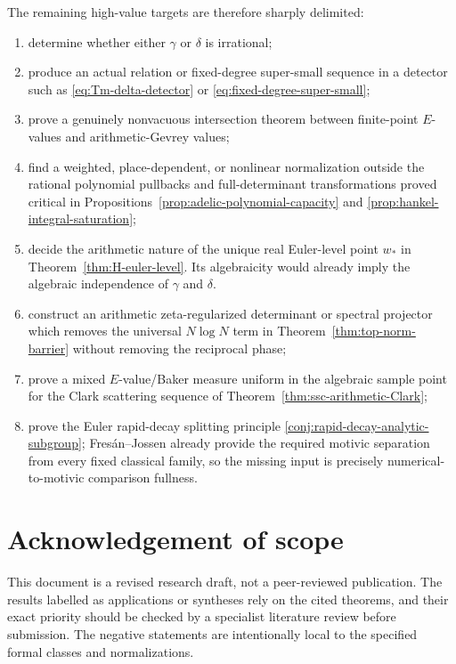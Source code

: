 \documentclass[11pt]{article}
\theoremstyle{definition}
\theoremstyle{remark}
\begin{document}
The remaining high-value targets are therefore sharply delimited:
\begin{enumerate}[leftmargin=2em]
\item determine whether either \(\gamma\) or \(\delta\) is irrational;
\item produce an actual relation or fixed-degree super-small sequence in a
detector such as \eqref{eq:Tm-delta-detector} or
\eqref{eq:fixed-degree-super-small};
\item prove a genuinely nonvacuous intersection theorem between finite-point
\(E\)-values and arithmetic-Gevrey values;
\item find a weighted, place-dependent, or nonlinear normalization outside
the rational polynomial pullbacks and full-determinant transformations proved
critical in Propositions~\ref{prop:adelic-polynomial-capacity} and
\ref{prop:hankel-integral-saturation};
\item decide the arithmetic nature of the unique real Euler-level point
\(w_*\) in Theorem~\ref{thm:H-euler-level}.  Its algebraicity would already
imply the algebraic independence of \(\gamma\) and \(\delta\).
\item construct an arithmetic zeta-regularized determinant or spectral
projector which removes the universal \(N\log N\) term in
Theorem~\ref{thm:top-norm-barrier} without removing the reciprocal phase;
\item prove a mixed \(E\)-value/Baker measure uniform in the algebraic sample
point for the Clark scattering sequence of
Theorem~\ref{thm:ssc-arithmetic-Clark};
\item prove the Euler rapid-decay splitting principle
\ref{conj:rapid-decay-analytic-subgroup}; Fres\'an--Jossen already provide the
required motivic separation from every fixed classical family, so the missing
input is precisely numerical-to-motivic comparison fullness.
\end{enumerate}

\section*{Acknowledgement of scope}

This document is a revised research draft, not a peer-reviewed publication.
The results labelled as applications or syntheses rely on the cited theorems,
and their exact priority should be checked by a specialist literature review
before submission.  The negative statements are intentionally local to the
specified formal classes and normalizations.
\end{document}
